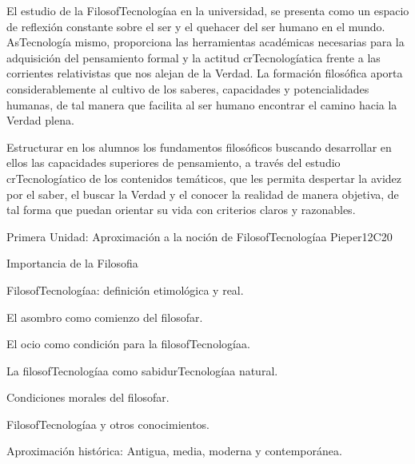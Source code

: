 \begin{syllabus}


\begin{justification}
El estudio de la FilosofTecnologíaa en la universidad, se presenta como un espacio de reflexión constante sobre el ser y el quehacer del ser humano en el mundo. AsTecnología mismo, proporciona las herramientas académicas necesarias para la adquisición del pensamiento formal y la actitud crTecnologíatica frente a las corrientes relativistas que nos alejan de la Verdad.
La formación filosófica aporta considerablemente al cultivo de los saberes, capacidades y potencialidades humanas, de tal manera que facilita al ser humano encontrar el camino hacia la Verdad plena.
\end{justification}

\begin{goals}
\item Estructurar en los alumnos los fundamentos filosóficos buscando desarrollar en ellos las capacidades superiores de pensamiento, a través del estudio crTecnologíatico de los contenidos temáticos, que les permita despertar la avidez por el saber, el buscar la Verdad y el conocer la realidad de manera objetiva, de tal forma que puedan orientar su vida con criterios claros y razonables.
\end{goals}

\begin{outcomes}
    \item {}
    \item {}
    \item {}
\end{outcomes}
\begin{competences}
    \item {}
    \item {}
\end{competences}

\begin{unit}{}{Primera Unidad: Aproximación a la noción de FilosofTecnologíaa }{Pieper}{12}{C20}
\begin{topics}
	\item Importancia de la Filosofia
	\item FilosofTecnologíaa: definición etimológica y real.
	\item El asombro como comienzo del filosofar.
	\item El ocio como condición para la filosofTecnologíaa.
    \item La filosofTecnologíaa como sabidurTecnologíaa natural.
    \item Condiciones morales del filosofar.
    \item FilosofTecnologíaa y otros conocimientos.
    \item Aproximación histórica: Antigua, media, moderna y contemporánea.
\end{topics}


\end{unit}
\end{syllabus}
